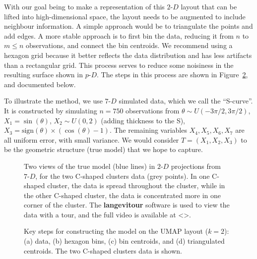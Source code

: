 \documentclass[
  12pt]{article}
\newcommand\pD{$p\text{-}D$}
\newcommand\gD{$2\text{-}D$}
\begin{document}
With our goal being to make a representation of this \gD{} layout that
can be lifted into high-dimensional space, the layout needs to be
augmented to include neighbour information. A simple approach would be
to triangulate the points and add edges. A more stable approach is to
first bin the data, reducing it from \(n\) to \(m\leq n\) observations,
and connect the bin centroids. We recommend using a hexagon grid because
it better reflects the data distribution and has less artifacts than a
rectangular grid. This process serves to reduce some noisiness in the
resulting surface shown in \pD{}. The steps in this process are shown in
Figure~\ref{fig-NLDR-two-curvy}, and documented below.

To illustrate the method, we use \(7\text{-}D\) simulated data, which we
call the ``S-curve''. It is constructed by simulating \(n=750\)
observations from \(\theta \sim U(-3\pi/2, 3\pi/2)\),
\(X_1 = \sin(\theta)\), \(X_2 \sim U(0, 2)\) (adding thickness to the
S), \(X_3 = \text{sign}(\theta) \times (\cos(\theta) - 1)\). The
remaining variables \(X_4, X_5, X_6, X_7\) are all uniform error, with
small variance. We would consider \(T=(X_1, X_2, X_3)\) to be the
geometric structure (true model) that we hope to capture.

\begin{figure}[H]


\caption{\label{fig-two-curvy-true-proj}Two views of the true model
(blue lines) in \(2\text{-}D\) projections from \(7\text{-}D\), for the
two C-shaped clusters data (grey points). In one C-shaped cluster, the
data is spread throughout the cluster, while in the other C-shaped
cluster, the data is concentrated more in one corner of the cluster. The
\textbf{langevitour} software is used to view the data with a tour, and
the full video is available at \textless\textgreater.}

\end{figure}%

\begin{figure}


\caption{\label{fig-NLDR-two-curvy}Key steps for constructing the model
on the UMAP layout (\(k=2\)): (a) data, (b) hexagon bins, (c) bin
centroids, and (d) triangulated centroids. The two C-shaped clusters
data is shown.}

\end{figure}%
\end{document}
